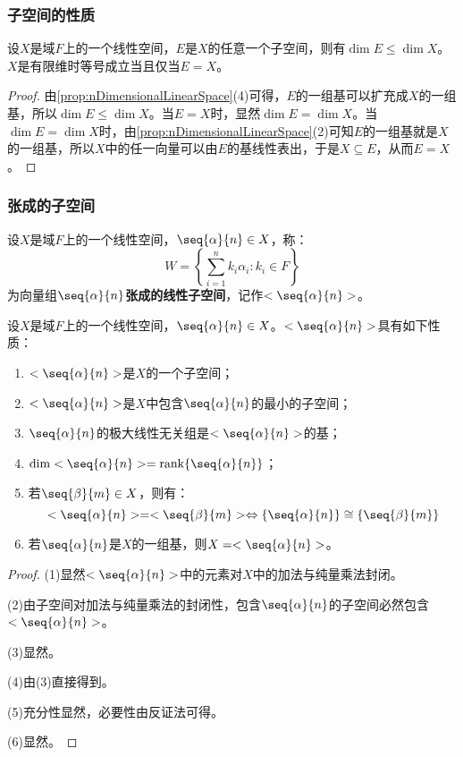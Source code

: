 \subsubsection{子空间的性质}
\begin{theorem}\label{theo:DimSubspace}
	设$X$是域$F$上的一个线性空间，$E$是$X$的任意一个子空间，则有$\dim E\leqslant\dim X$。$X$是有限维时等号成立当且仅当$E=X$。
\end{theorem}
\begin{proof}
	由\cref{prop:nDimensionalLinearSpace}(4)可得，$E$的一组基可以扩充成$X$的一组基，所以$\dim E\leqslant\dim X$。当$E=X$时，显然$\dim E=\dim X$。当$\dim E=\dim X$时，由\cref{prop:nDimensionalLinearSpace}(2)可知$E$的一组基就是$X$的一组基，所以$X$中的任一向量可以由$E$的基线性表出，于是$X\subseteq E$，从而$E=X$。
\end{proof}
\subsubsection{张成的子空间}
\begin{definition}
	设$X$是域$F$上的一个线性空间，$\seq{\alpha}{n}\in X$，称：
	\begin{equation*}
		W=\left\{\sum_{i=1}^{n}k_i\alpha_i:k_i\in F\right\}
	\end{equation*}
	为向量组$\seq{\alpha}{n}$\textbf{张成的线性子空间}，记作$<\seq{\alpha}{n}>$。
\end{definition}
\begin{property}\label{prop:SpanSubspace}
	设$X$是域$F$上的一个线性空间，$\seq{\alpha}{n}\in X$。$<\seq{\alpha}{n}>$具有如下性质：
	\begin{enumerate}
		\item $<\seq{\alpha}{n}>$是$X$的一个子空间；
		\item $<\seq{\alpha}{n}>$是$X$中包含$\seq{\alpha}{n}$的最小的子空间；
		\item $\seq{\alpha}{n}$的极大线性无关组是$<\seq{\alpha}{n}>$的基；
		\item $\operatorname{dim}<\seq{\alpha}{n}>=\operatorname{rank}\{\seq{\alpha}{n}\}$；
		\item 若$\seq{\beta}{m}\in X$，则有：
		\begin{equation*}
			<\seq{\alpha}{n}>=<\seq{\beta}{m}>\Leftrightarrow\{\seq{\alpha}{n}\}\cong\{\seq{\beta}{m}\}
		\end{equation*}
		\item 若$\seq{\alpha}{n}$是$X$的一组基，则$X=<\seq{\alpha}{n}>$。
	\end{enumerate}
\end{property}
\begin{proof}
	(1)显然$<\seq{\alpha}{n}>$中的元素对$X$中的加法与纯量乘法封闭。\par
	(2)由子空间对加法与纯量乘法的封闭性，包含$\seq{\alpha}{n}$的子空间必然包含$<\seq{\alpha}{n}>$。\par
	(3)显然。\par
	(4)由(3)直接得到。\par
	(5)充分性显然，必要性由反证法可得。\par
	(6)显然。
\end{proof}
